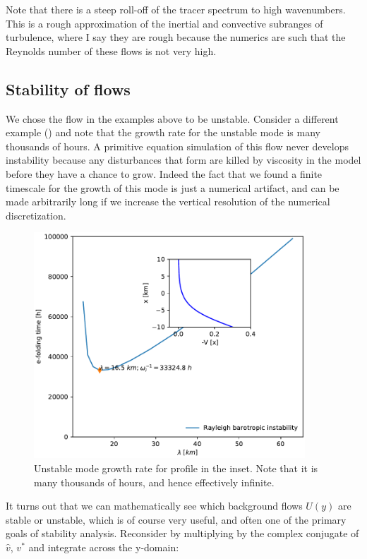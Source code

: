 \documentclass[11pt]{article}
\begin{document}
Note that there is a steep roll-off of the tracer spectrum to high wavenumbers.  This is a rough approximation of the inertial and convective subranges of turbulence, where I say they are rough because the numerics are such that the Reynolds number of these flows is not very high. 

\clearpage

\subsection{Stability of flows}

We chose the flow in the examples above to be unstable.  Consider a different example () and note that the growth rate for the unstable mode is many thousands of hours.  A primitive equation simulation of this flow never develops instability because any disturbances that form are killed by viscosity in the model before they have a chance to grow.  Indeed the fact that we found a finite timescale for the growth of this mode is just a numerical artifact, and can be made arbitrarily long if we increase the vertical resolution of the numerical discretization.  

\begin{figure}[hbtp]
  \begin{center}
    \includegraphics[width=4in]{images/RayleighInstabilityStable.pdf}
  \end{center}
  \caption{Unstable mode growth rate for profile in the inset.  Note that it is many thousands of hours, and hence effectively infinite.}
  \label{fig:RayleighInstabilityStable}
\end{figure}

It turns out that we can mathematically see which background flows $U(y)$ are stable or unstable, which is of course very useful, and often one of the primary goals of stability analysis.  Reconsider  by multiplying by the complex conjugate of $\hat{v}$, $v^*$ and integrate across the y-domain:
\end{document}
